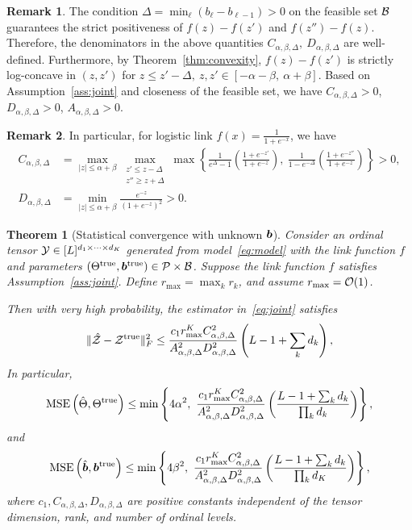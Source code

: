\documentclass{article}
\theoremstyle{plain}
\newtheorem{thm}{Theorem}[section]
\theoremstyle{definition}
\newtheorem{rmk}{Remark}
\begin{document}
\begin{rmk}
The condition $\Delta=\min_{\ell}(b_{\ell}-b_{\ell-1})>0$ on the feasible set $\mathcal{B}$ guarantees the strict positiveness of $f(z)-f(z')$ and $f(z'')-f(z)$. Therefore, the denominators in the above quantities $C_{\alpha,\beta,\Delta},\ D_{\alpha,\beta,\Delta}$ are well-defined. Furthermore, by Theorem~\ref{thm:convexity}, $f(z)-f(z')$ is strictly log-concave in $(z,z')$ for $z\leq z'-\Delta,\ z,z'\in[-\alpha-\beta,\ \alpha+\beta]$. Based on Assumption~\ref{ass:joint} and closeness of the feasible set, we have $C_{\alpha,\beta,\Delta}>0$, $D_{\alpha,\beta,\Delta}>0$, $A_{\alpha,\beta,\Delta}>0$.
\end{rmk}
\begin{rmk} In particular, for logistic link $f(x)= \frac{1}{1+e^{-x}}$, we have
\begin{align}
C_{\alpha,\beta,\Delta}&=\max_{|z|\leq \alpha+\beta}\max_{\substack{z'\leq z-\Delta\\z''\geq z+\Delta}}\max\left\{ \frac{1}{e^\Delta-1}\left(\frac{1+e^{-z'}}{1+e^{-z}}\right),\ \frac{1}{1-e^{-\Delta}}\left(\frac{1+e^{-z''}}{1+e^{-z}}\right)\right\}>0,\\
D_{\alpha,\beta,\Delta}&=\min_{|z|\leq \alpha+\beta}\frac{e^{-z}}{(1+e^{-z})^2}>0.\end{align}
\end{rmk}
\begin{thm}[Statistical convergence with unknown $\bm{b}$]\label{thm:ratejoint}
Consider an ordinal tensor $\mathcal{Y}\in[L]^{d_1\times \cdots \times d_K}$ generated from model~\eqref{eq:model} with the link function $f$ and parameters $(\Theta^{\mathrm{true}}, \bm{b}^{\mathrm{true}})\in\mathcal{P}\times \mathcal{B}$. Suppose the link function $f$ satisfies Assumption~\ref{ass:joint}. Define $r_{\max}=\max_k r_k$, and assume $r_{\max}=\mathcal{O}(1)$. 

Then with very high probability, the estimator in~\eqref{eq:joint} satisfies
\begin{equation}\label{eq:scoreZ}
\lVert\hat {\mathcal{Z}}-\mathcal{Z}^{\mathrm{true}}\rVert_F^2 \leq {c_1r^{K}_{\max}C^2_{\alpha,\beta,\Delta}\over A^2_{\alpha,\beta,\Delta}D^2_{\alpha,\beta,\Delta}}\left(L-1+\sum_k d_k\right),
\end{equation}
In particular,
\begin{equation}\label{eq:jointTheta}
\mathrm{MSE}\left(\hat \Theta, \Theta^{\mathrm{true}} \right)\leq\min\left\{ 4\alpha^2,\  {c_1 r_{\max}^{K}  C_{\alpha,\beta,\Delta}^2 \over A^2_{\alpha,\beta,\Delta}D_{\alpha,\beta,\Delta}^2}\left({ L-1+\sum_k d_k \over \prod_k d_k}\right)\right\},
\end{equation}
and
\begin{equation}\label{eq:jointb}
\mathrm{MSE}\left(\hat \mb, \trueb \right)\leq \min\left\{4\beta^2,\ {c_1 r^{K}_{\max} C^2_{\alpha,\beta,\Delta} \over A^2_{\alpha,\beta,\Delta}D_{\alpha,\beta,\Delta}^2}\left({L-1+\sum_kd_k \over \prod_k d_K}\right)\right\},
\end{equation}
where $c_1, C_{\alpha,\beta,\Delta}, D_{\alpha,\beta,\Delta}$ are positive constants independent of the tensor dimension, rank, and number of ordinal levels. 
\end{thm}
\end{document}
